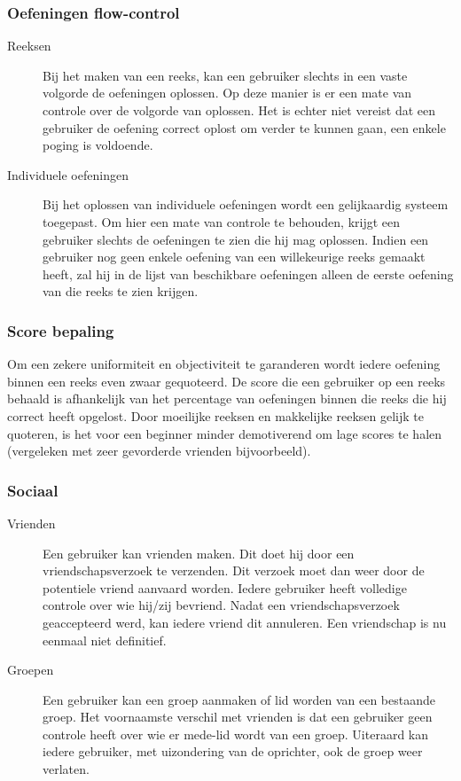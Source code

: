 \subsubsection{Oefeningen flow-control}
\begin{description}
\item[Reeksen] Bij het maken van een reeks, kan een gebruiker slechts in een vaste volgorde de oefeningen oplossen. Op deze manier is er
een mate van controle over de volgorde van oplossen. Het is echter niet vereist dat een gebruiker de oefening correct oplost
om verder te kunnen gaan, een enkele poging is voldoende.
\item[Individuele oefeningen] Bij het oplossen van individuele oefeningen wordt een gelijkaardig systeem toegepast. Om hier een mate van controle te behouden,
krijgt een gebruiker slechts de oefeningen te zien die hij mag oplossen. Indien een gebruiker nog geen enkele oefening van een
willekeurige reeks gemaakt heeft, zal hij in de lijst van beschikbare oefeningen alleen de eerste oefening van die reeks te zien
krijgen.
\end{description}

\subsubsection{Score bepaling}
Om een zekere uniformiteit en objectiviteit te garanderen wordt iedere oefening binnen een reeks even zwaar gequoteerd. De score
die een gebruiker op een reeks behaald is afhankelijk van het percentage van oefeningen binnen die reeks die hij correct heeft opgelost.
Door moeilijke reeksen en makkelijke reeksen gelijk te quoteren, is het voor een beginner minder demotiverend om lage scores te halen
(vergeleken met zeer gevorderde vrienden bijvoorbeeld).

\subsubsection{Sociaal}
\begin{description}
\item[Vrienden] Een gebruiker kan vrienden maken. Dit doet hij door een vriendschapsverzoek te verzenden. Dit verzoek moet dan weer door
de potentiele vriend aanvaard worden. Iedere gebruiker heeft volledige controle over wie hij/zij bevriend. Nadat een vriendschapsverzoek
geaccepteerd werd, kan iedere vriend dit annuleren. Een vriendschap is nu eenmaal niet definitief.
\item[Groepen] Een gebruiker kan een groep aanmaken of lid worden van een bestaande groep. Het voornaamste verschil met vrienden is dat
een gebruiker geen controle heeft over wie er mede-lid wordt van een groep. Uiteraard kan iedere gebruiker, met uizondering van de oprichter,
ook de groep weer verlaten.
\end{description}
